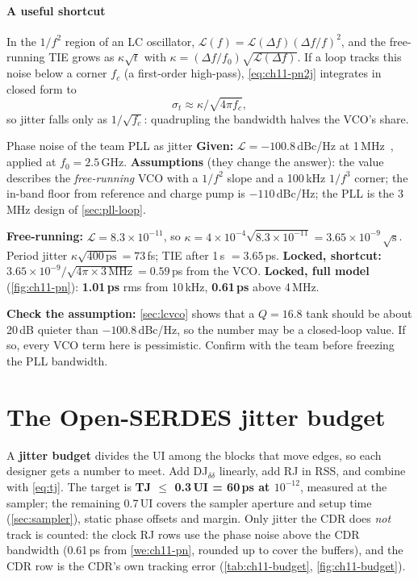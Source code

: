 \paragraph{A useful shortcut} In the $1/f^2$ region of an LC oscillator, $\mathcal{L}(f) = \mathcal{L}(\Delta f)(\Delta f/f)^2$, and the free-running TIE grows as $\kappa\sqrt{t}$ with $\kappa = (\Delta f/f_0)\sqrt{\mathcal{L}(\Delta f)}$. If a loop tracks this noise below a corner $f_c$ (a first-order high-pass), \cref{eq:ch11-pn2j} integrates in closed form to
\begin{equation}
  \sigma_t \approx \kappa/\sqrt{4\pi f_c} ,
  \label{eq:ch11-kappa}
\end{equation}
so jitter falls only as $1/\sqrt{f_c}$: quadrupling the bandwidth halves the VCO's share.

\begin{example}{Phase noise of the team PLL as jitter}\label{we:ch11-pn}
\textbf{Given:} $\mathcal{L} = -100.8$\,dBc/Hz at 1\,MHz~\cite{smacd2026pll}, applied at $f_0 = 2.5$\,GHz.
\textbf{Assumptions} (they change the answer): the value describes the \emph{free-running} VCO with a $1/f^2$ slope and a 100\,kHz $1/f^3$ corner; the in-band floor from reference and charge pump is $-110$\,dBc/Hz; the PLL is the 3\,MHz design of \cref{sec:pll-loop}.

\textbf{Free-running:} $\mathcal{L} = 8.3\times10^{-11}$, so $\kappa = 4\times10^{-4}\sqrt{8.3\times10^{-11}} = 3.65\times10^{-9}\,\sqrt{\mathrm{s}}$. Period jitter $\kappa\sqrt{400\,\mathrm{ps}} = 73$\,fs; TIE after 1\,\textmu{}s $= 3.65$\,ps.
\textbf{Locked, shortcut:} $3.65\times10^{-9}/\sqrt{4\pi\times3\,\mathrm{MHz}} = 0.59$\,ps from the VCO.
\textbf{Locked, full model} (\cref{fig:ch11-pn}): \textbf{1.01\,ps} rms from 10\,kHz, \textbf{0.61\,ps} above 4\,MHz.

\textbf{Check the assumption:} \cref{sec:lcvco} shows that a $Q = 16.8$ tank should be about 20\,dB quieter than $-100.8$\,dBc/Hz, so the number may be a closed-loop value. If so, every VCO term here is pessimistic. Confirm with the team before freezing the PLL bandwidth.
\end{example}

\section{The Open-SERDES jitter budget}\label{sec:jitter-budget}

A \textbf{jitter budget} divides the UI among the blocks that move edges, so each designer gets a number to meet. Add DJ$_{\delta\delta}$ linearly, add RJ in RSS, and combine with \cref{eq:tj}. The \OS{} target is \textbf{TJ $\le$ 0.3\,UI = 60\,ps at $10^{-12}$}, measured at the sampler; the remaining 0.7\,UI covers the sampler aperture and setup time (\cref{sec:sampler}), static phase offsets and margin. Only jitter the CDR does \emph{not} track is counted: the clock RJ rows use the phase noise above the CDR bandwidth (0.61\,ps from \cref{we:ch11-pn}, rounded up to cover the buffers), and the CDR row is the CDR's own tracking error (\cref{tab:ch11-budget}, \cref{fig:ch11-budget}).

